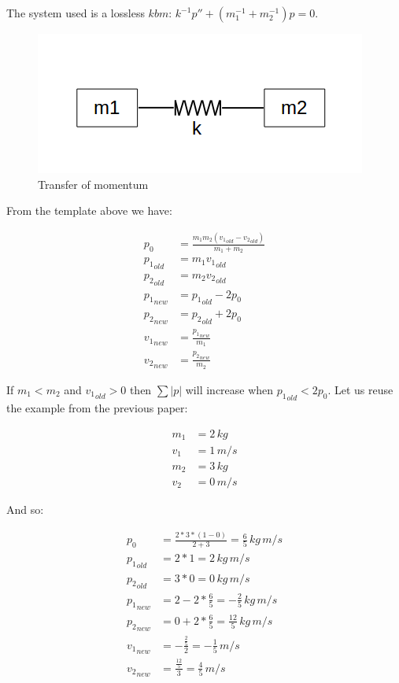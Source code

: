 The system used is a lossless $kbm$\cite{analogies}: $k^{-1} p'' + (m_1^{-1} + m_2^{-1}) p = 0$.

\begin{figure}[ht] \centering
	\includegraphics[scale=.3]{mkm} \caption{Transfer of momentum}
\end{figure}

From the template above we have:

\begin{align}
p_0 &= \frac{m_1 m_2 ({v_1}_{old}-{v_2}_{old})}{m_1 + m_2} \\
{p_1}_{old} &= m_1 {v_1}_{old} \\
{p_2}_{old} &= m_2 {v_2}_{old} \\
{p_1}_{new} &= {p_1}_{old} -2 p_0 \\
{p_2}_{new} &= {p_2}_{old} +2 p_0 \\
{v_1}_{new} &= \frac{{p_1}_{new}}{m_1} \\
{v_2}_{new} &= \frac{{p_2}_{new}}{m_2}
\end{align}

If $m_1 < m_2$ and ${v_1}_{old} > 0$ then $\sum |p|$ will increase when ${p_1}_{old} < 2 p_0$.
Let us reuse the example from the previous paper\cite{incmom}:

\begin{align}
m_1 &= 2 \, kg \\
v_1 &= 1 \, m/s \\
m_2 &= 3 \, kg \\
v_2 &= 0 \, m/s
\end{align}

And so:

\begin{align}
p_0 &= \frac{2 * 3 * (1-0)}{2 + 3} = \frac{6}{5} \, kg \, m/s \\
{p_1}_{old} &= 2 * 1 = 2 \, kg \, m/s \\
{p_2}_{old} &= 3 * 0 = 0 \, kg \, m/s \\
{p_1}_{new} &= 2 -2 * \frac{6}{5} = -\frac{2}{5} \, kg \, m/s \\
{p_2}_{new} &= 0 +2 * \frac{6}{5} = \frac{12}{5} \, kg \, m/s \\
{v_1}_{new} &= -\frac{\frac{2}{5}}{2} = -\frac{1}{5} \, m/s \\
{v_2}_{new} &= \frac{\frac{12}{5}}{3} = \frac{4}{5} \, m/s
\end{align}

